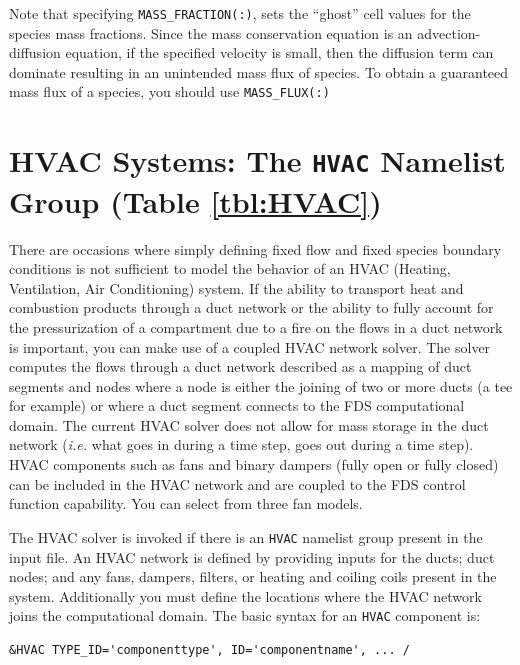 \documentclass[11pt]{book}
\newcommand{\ct}{\tt\small}
\begin{document}
\begin{warning}
\noindent
Note that specifying {\ct MASS\_FRACTION(:)}, sets the ``ghost'' cell values for the species
mass fractions.  Since the mass conservation equation is an advection-diffusion equation,
if the specified velocity is small, then the diffusion term can dominate resulting in an unintended
mass flux of species.  To obtain a guaranteed mass flux of a species, you should use {\ct MASS\_FLUX(:)}
\end{warning}








\clearpage

\section{HVAC Systems: The \texorpdfstring{{\tt HVAC}}{HVAC} Namelist Group (Table \ref{tbl:HVAC})}
\label{info:HVAC}

There are occasions where simply defining fixed flow and fixed species boundary conditions is not sufficient to model the behavior of an HVAC (Heating, Ventilation,
Air Conditioning) system.
If the ability to transport heat and combustion products through a duct network or the ability to fully account for the pressurization of a compartment
due to a fire on the flows in a duct network is important, you can make use of a coupled HVAC network solver.  The solver computes the flows through a
duct network described as a mapping of duct segments and nodes where a node is either the joining of two or more ducts (a tee for example) or where a duct segment connects to the FDS computational domain.
The current HVAC solver does not allow for mass storage in the duct network ({\em i.e.} what goes in during a time step, goes out during a time step).
HVAC components such as fans and binary dampers (fully open or fully closed) can be included in the HVAC network and are coupled to the FDS control function capability.  You can select from three fan models.

The HVAC solver is invoked if there is an {\ct HVAC} namelist group present in the input file.
An HVAC network is defined by providing inputs for the ducts; duct nodes; and any fans, dampers, filters, or heating and coiling coils present in the system.
Additionally you must define the locations where the HVAC network joins the computational domain.  The basic syntax for an {\ct HVAC} component is:

\footnotesize
\begin{verbatim}
&HVAC TYPE_ID='componenttype', ID='componentname', ... /
\end{verbatim}\normalsize
\end{document}
